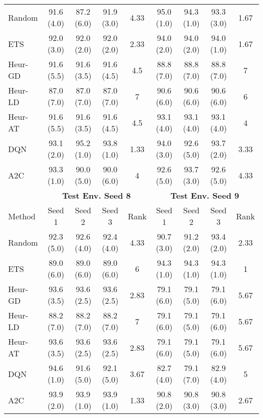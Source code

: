 \begin{table}[t]
{\begin{tabular}{lcccccccc}
Random    & 91.6 (4.0)  & 87.2 (6.0)  & 91.9 (3.0) & 4.33 & 95.0 (1.0)  & 94.3 (1.0)  & 93.3 (3.0) & 1.67 \\
ETS       & 92.0 (3.0)  & 92.0 (2.0)  & 92.0 (2.0) & 2.33 & 94.0 (2.0)  & 94.0 (2.0)  & 94.0 (1.0) & 1.67 \\
Heur-GD   & 91.6 (5.5)  & 91.6 (3.5)  & 91.6 (4.5) & 4.5  & 88.8 (7.0)  & 88.8 (7.0)  & 88.8 (7.0) & 7    \\
Heur-LD   & 87.0 (7.0)  & 87.0 (7.0)  & 87.0 (7.0) & 7    & 90.6 (6.0)  & 90.6 (6.0)  & 90.6 (6.0) & 6    \\
Heur-AT   & 91.6 (5.5)  & 91.6 (3.5)  & 91.6 (4.5) & 4.5  & 93.1 (4.0)  & 93.1 (4.0)  & 93.1 (4.0) & 4    \\
DQN       & 93.1 (2.0)  & 95.2 (1.0)  & 93.8 (1.0) & 1.33 & 94.0 (3.0)  & 92.6 (5.0)  & 93.7 (2.0) & 3.33 \\
A2C       & 93.3 (1.0)  & 90.0 (5.0)  & 90.0 (6.0) & 4    & 92.6 (5.0)  & 93.7 (3.0)  & 92.6 (5.0) & 4.33 \\ \midrule
\textbf{} & \multicolumn{4}{c}{\textbf{Test Env. Seed 8}} & \multicolumn{4}{c}{\textbf{Test Env. Seed 9}} \\
\cmidrule(lr){2-5} \cmidrule(lr){6-9} 
Method    & Seed 1      & Seed 2      & Seed 3     & Rank & Seed 1      & Seed 2      & Seed 3     & Rank \\ \midrule
Random    & 92.3 (5.0)  & 92.6 (4.0)  & 92.4 (4.0) & 4.33 & 90.7 (3.0)  & 91.2 (2.0)  & 93.4 (2.0) & 2.33 \\
ETS       & 89.0 (6.0)  & 89.0 (6.0)  & 89.0 (6.0) & 6    & 94.3 (1.0)  & 94.3 (1.0)  & 94.3 (1.0) & 1    \\
Heur-GD   & 93.6 (3.5)  & 93.6 (2.5)  & 93.6 (2.5) & 2.83 & 79.1 (6.0)  & 79.1 (5.0)  & 79.1 (6.0) & 5.67 \\
Heur-LD   & 88.2 (7.0)  & 88.2 (7.0)  & 88.2 (7.0) & 7    & 79.1 (6.0)  & 79.1 (5.0)  & 79.1 (6.0) & 5.67 \\
Heur-AT   & 93.6 (3.5)  & 93.6 (2.5)  & 93.6 (2.5) & 2.83 & 79.1 (6.0)  & 79.1 (5.0)  & 79.1 (6.0) & 5.67 \\
DQN       & 94.6 (1.0)  & 91.6 (5.0)  & 92.1 (5.0) & 3.67 & 82.7 (4.0)  & 79.1 (7.0)  & 82.9 (4.0) & 5    \\
A2C       & 93.9 (2.0)  & 93.9 (1.0)  & 93.9 (1.0) & 1.33 & 90.8 (2.0)  & 90.8 (3.0)  & 90.8 (3.0) & 2.67 \\
\bottomrule
\end{tabular}
}
\end{table}